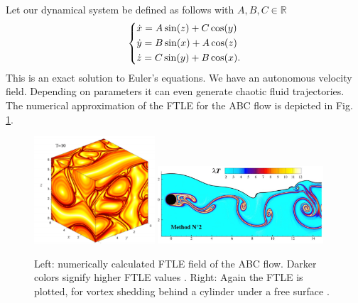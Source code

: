 \begin{ex}
	Let our dynamical system be defined as follows with $A,B,C \in \mathbb{R}$
\begin{align}
	\begin{dcases}
		\dot{x} = A \sin(z) + C \cos(y) \\
		\dot{y} = B \sin(x) + A \cos(z) \\
		\dot{z} = C \sin(y) + B \cos(x).
	\end{dcases}
\end{align}
This is an exact solution to Euler's equations.  We have an autonomous velocity field. Depending on parameters it can even generate chaotic fluid trajectories. The numerical approximation of the FTLE for the ABC flow is depicted in Fig. \ref{fig:FTLE_flows}.
\begin{figure}[h!]
	\centering
	\includegraphics[width=0.4\textwidth]{figures/ch1/14fluid1.png}
	\hspace{0.03\textwidth}
	\includegraphics[width=0.55\textwidth]{figures/ch1/15vortex_shedding.png}
	\caption{Left: numerically calculated FTLE field of the ABC flow. Darker colors signify higher FTLE values \cite{Haller2001}. Right: Again the FTLE is plotted, for vortex shedding behind a cylinder under a free surface \cite{Sun2016}.}
	\label{fig:FTLE_flows}
\end{figure}
\end{ex}
